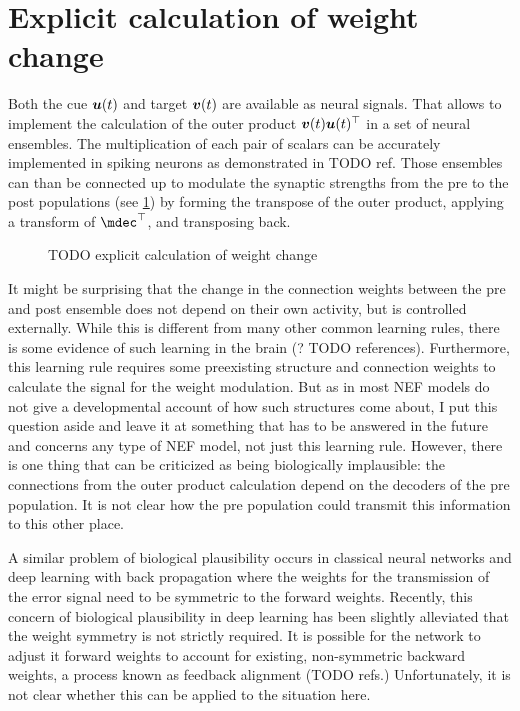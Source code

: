 \section{Explicit calculation of weight change}
Both the cue $\bm{u}(t)$ and target $\bm{v}(t)$ are available as neural signals.
That allows to implement the calculation of the outer product $\bm{v}(t) \bm{u}(t)^{\top}$ in a set of neural ensembles.
The multiplication of each pair of scalars can be accurately implemented in spiking neurons as demonstrated in TODO ref.
Those ensembles can than be connected up to modulate the synaptic strengths from the pre to the post populations (see \cref{fig:aml-explicit}) by forming the transpose of the outer product, applying a transform of $\mdec\Tr$, and transposing back.
\begin{figure}
    \centering
    \caption{TODO explicit calculation of weight change}\label{fig:aml-explicit}
\end{figure}

It might be surprising that the change in the connection weights between the pre and post ensemble does not depend on their own activity, but is controlled externally.
While this is different from many other common learning rules, there is some evidence of such learning in the brain (? TODO references).
Furthermore, this learning rule requires some preexisting structure and connection weights to calculate the signal for the weight modulation.
But as in most NEF models do not give a developmental account of how such structures come about, I put this question aside and leave it at something that has to be answered in the future and concerns any type of NEF model, not just this learning rule.
However, there is one thing that can be criticized as being biologically implausible: the connections from the outer product calculation depend on the decoders of the pre population.
It is not clear how the pre population could transmit this information to this other place.

A similar problem of biological plausibility occurs in classical neural networks and deep learning with back propagation where the weights for the transmission of the error signal need to be symmetric to the forward weights.
Recently, this concern of biological plausibility in deep learning has been slightly alleviated that the weight symmetry is not strictly required.
It is possible for the network to adjust it forward weights to account for existing, non-symmetric backward weights, a process known as feedback alignment (TODO refs.)
Unfortunately, it is not clear whether this can be applied to the situation here.


